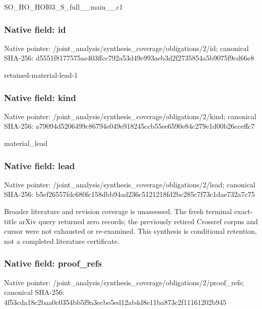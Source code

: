 \documentclass[10pt,a4paper]{article}
\begin{document}
\begingroup\raggedright\sloppy SO\_\allowbreak{}HO\_\allowbreak{}HOI03\_\allowbreak{}S\_\allowbreak{}full\_\allowbreak{}\_\allowbreak{}main\_\allowbreak{}\_\allowbreak{}c1\par\endgroup

\subsubsection{Native field: id}
Native pointer: /joint\_\allowbreak{}analysis/synthesis\_\allowbreak{}coverage/obligations/2/id; canonical SHA-256: d5551f8177575ae403ffcc792a53d49e993aeb3d2f2735854a5b9075f9cd66e8

\begingroup\raggedright\sloppy retained-material-lead-1\par\endgroup

\subsubsection{Native field: kind}
Native pointer: /joint\_\allowbreak{}analysis/synthesis\_\allowbreak{}coverage/obligations/2/kind; canonical SHA-256: a79094d5206499c86794e049e918245ccb55ee6590e84c279e1d00b26cceffc7

\begingroup\raggedright\sloppy material\_\allowbreak{}lead\par\endgroup

\subsubsection{Native field: lead}
Native pointer: /joint\_\allowbreak{}analysis/synthesis\_\allowbreak{}coverage/obligations/2/lead; canonical SHA-256: b5ef26557fdc680fc158dbb94ad236c5121218fd2bc285c7f73c1dae732a7c75

\begingroup\raggedright\sloppy Broader literature and revision coverage is unassessed. The fresh terminal exact-title arXiv query returned zero records;\allowbreak{} the previously retired Crossref corpus and cursor were not exhausted or re-examined. This synthesis is conditional retention,\allowbreak{} not a completed literature certificate.\par\endgroup

\subsubsection{Native field: proof\_\allowbreak{}refs}
Native pointer: /joint\_\allowbreak{}analysis/synthesis\_\allowbreak{}coverage/obligations/2/proof\_\allowbreak{}refs; canonical SHA-256: 4f53cda18c2baa0c0354bb5f9a3ecbe5ed12ab4d8e11ba873c2f11161202b945
\end{document}

